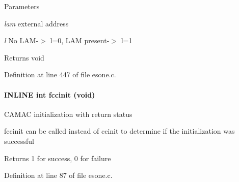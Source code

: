 \begin{DoxyParams}{Parameters}
\item[{\em lam}]external address \item[{\em l}]No LAM-\/$>$ l=0, LAM present-\/$>$ l=1 \end{DoxyParams}
\begin{DoxyReturn}{Returns}
void 
\end{DoxyReturn}


Definition at line 447 of file esone.c.
\paragraph[{fccinit}]{\setlength{\rightskip}{0pt plus 5cm}INLINE int fccinit (void)}\hfill\label{esone_8c_aa0f89d29b128e78472312a327afeb0eb}
CAMAC initialization with return status

fccinit can be called instead of ccinit to determine if the initialization was successful

\begin{DoxyReturn}{Returns}
1 for success, 0 for failure 
\end{DoxyReturn}


Definition at line 87 of file esone.c.